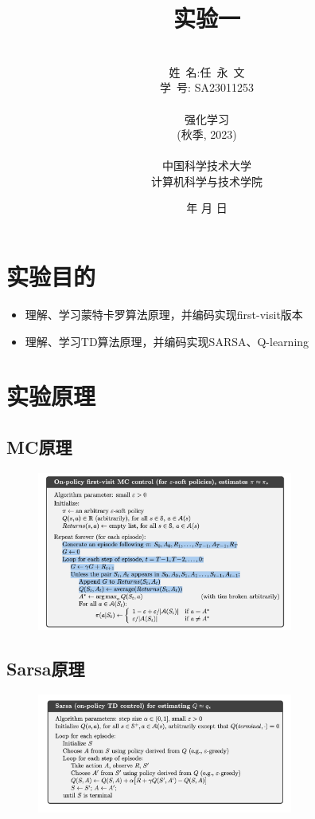 \documentclass{ctexart}
\renewcommand{\today}{\number\year 年 \number\month 月 \number\day 日}
\begin{document}
\title{\Huge 实验一}
\author{\\姓\ 名:任\ 永\ 文\\
    学\ 号: SA23011253\\\\
    强化学习\\
    (秋季, 2023)\\\\
    中国科学技术大学\\
    计算机科学与技术学院\\
}
\date{\today}
\maketitle
\newpage


\section{实验目的}
\begin{itemize}
    \item 理解、学习蒙特卡罗算法原理，并编码实现first-visit版本
    \item 理解、学习TD算法原理，并编码实现SARSA、Q-learning
\end{itemize}



\section{实验原理}
\subsection*{MC原理}
\begin{figure}[H]
    \centering
    \includegraphics[width=0.75\textwidth]{1.png}
\end{figure}

\subsection*{Sarsa原理}
\begin{figure}[H]
    \centering
    \includegraphics[width=0.75\textwidth]{2.png}
\end{figure}
\end{document}
